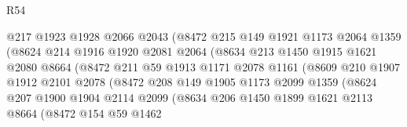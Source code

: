 \begin{lexlean}{R54}
\begin{coremodule}
                            @217
                            @1923
                            @1928
                            @2066
                            @2043
                            (@8472
                              @215
                              @149
                              @1921
                              @1173
                              @2064
                              @1359
                              (@8624
                                @214
                                @1916
                                @1920
                                @2081
                                @2064
                                (@8634
                                  @213
                                  @1450
                                  @1915
                                  @1621
                                  @2080
                                  @8664
                                  (@8472
                                    @211
                                    @59
                                    @1913
                                    @1171
                                    @2078
                                    @1161
                                    (@8609
                                      @210
                                      @1907
                                      @1912
                                      @2101
                                      @2078
                                      (@8472
                                        @208
                                        @149
                                        @1905
                                        @1173
                                        @2099
                                        @1359
                                        (@8624
                                          @207
                                          @1900
                                          @1904
                                          @2114
                                          @2099
                                          (@8634
                                            @206
                                            @1450
                                            @1899
                                            @1621
                                            @2113
                                            @8664
                                            (@8472
                                              @154
                                              @59
                                              @1462

\end{coremodule}
\end{lexlean}
